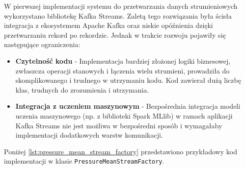 W pierwszej implementacji systemu do przetwarzania danych strumieniowych wykorzystano bibliotekę Kafka Streams. Zaletą tego rozwiązania była ścisła integracja z ekosystemem Apache Kafka oraz niskie opóźnienia dzięki przetwarzaniu rekord po rekordzie. Jednak w trakcie rozwoju pojawiły się następujące ograniczenia:
\begin{itemize}
    \item \textbf{Czytelność kodu} - Implementacja bardziej złożonej logiki biznesowej, zwłaszcza operacji stanowych i łączenia wielu strumieni, prowadziła do skomplikowanego i trudnego w utrzymaniu kodu. Kod zawierał dużą liczbę klas, trudnych do zrozumienia i utrzymania.
    \item \textbf{Integracja z uczeniem maszynowym} - Bezpośrednia integracja modeli uczenia maszynowego (np. z biblioteki Spark MLlib) w ramach aplikacji Kafka Streams nie jest możliwa w bezpośredni sposób i wymagałaby implementacji dodatkowych warstw komunikacji.
\end{itemize}

Poniżej \ref{lst:pressure_mean_stream_factory} przedstawiono przykładowy kod implementacji w klasie \texttt{PressureMeanStreamFactory}.

